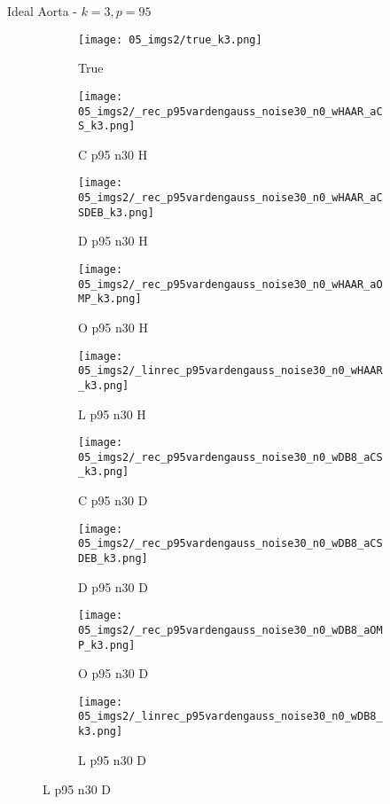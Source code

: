 \begin{frame}{Ideal Aorta - $k=3,p=95$}{}
\begin{figure}
\begin{subfigure}{0.1\textwidth}
\texttt{[image: 05\_imgs2/true\_k3.png]}
\caption*{\Tiny True}
\end{subfigure}
\begin{subfigure}{0.1\textwidth}
\texttt{[image: 05\_imgs2/\_rec\_p95vardengauss\_noise30\_n0\_wHAAR\_aCS\_k3.png]}
\caption*{\Tiny C p95 n30 H}
\end{subfigure}
\begin{subfigure}{0.1\textwidth}
\texttt{[image: 05\_imgs2/\_rec\_p95vardengauss\_noise30\_n0\_wHAAR\_aCSDEB\_k3.png]}
\caption*{\Tiny D p95 n30 H}
\end{subfigure}
\begin{subfigure}{0.1\textwidth}
\texttt{[image: 05\_imgs2/\_rec\_p95vardengauss\_noise30\_n0\_wHAAR\_aOMP\_k3.png]}
\caption*{\Tiny O p95 n30 H}
\end{subfigure}
\begin{subfigure}{0.1\textwidth}
\texttt{[image: 05\_imgs2/\_linrec\_p95vardengauss\_noise30\_n0\_wHAAR\_k3.png]}
\caption*{\Tiny L p95 n30 H}
\end{subfigure}
\begin{subfigure}{0.1\textwidth}
\texttt{[image: 05\_imgs2/\_rec\_p95vardengauss\_noise30\_n0\_wDB8\_aCS\_k3.png]}
\caption*{\Tiny C p95 n30 D}
\end{subfigure}
\begin{subfigure}{0.1\textwidth}
\texttt{[image: 05\_imgs2/\_rec\_p95vardengauss\_noise30\_n0\_wDB8\_aCSDEB\_k3.png]}
\caption*{\Tiny D p95 n30 D}
\end{subfigure}
\begin{subfigure}{0.1\textwidth}
\texttt{[image: 05\_imgs2/\_rec\_p95vardengauss\_noise30\_n0\_wDB8\_aOMP\_k3.png]}
\caption*{\Tiny O p95 n30 D}
\end{subfigure}
\begin{subfigure}{0.1\textwidth}
\texttt{[image: 05\_imgs2/\_linrec\_p95vardengauss\_noise30\_n0\_wDB8\_k3.png]}
\caption*{\Tiny L p95 n30 D}
\end{subfigure}
\end{figure}
\end{frame}



